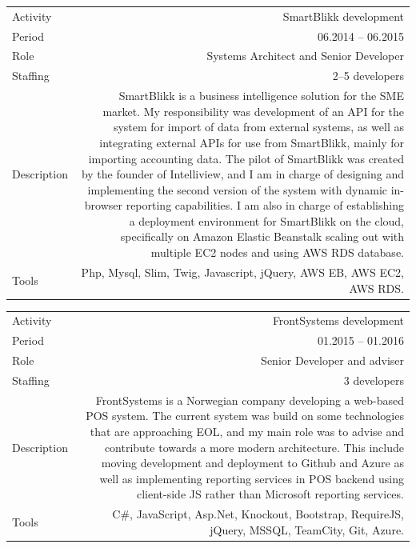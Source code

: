 \documentclass[english,a4paper,11pt]{article}
\begin{document}
\begin{longtable}{@{}LR}
Activity & SmartBlikk development \\ 
Period & 06.2014 -- 06.2015 \\ 
Role & Systems Architect and Senior Developer \\ 
Staffing & 2--5 developers \\ 
Description & SmartBlikk is a business intelligence solution for the SME market. My responsibility was development of an API for the system for import of data from external systems, as well as integrating external APIs for use from SmartBlikk, mainly for importing accounting data. The pilot of SmartBlikk was created by the founder of Intelliview, and I am in charge of designing and implementing the second version of the system with dynamic in-browser reporting capabilities. I am also in charge of establishing a deployment environment for SmartBlikk on the cloud, specifically on Amazon Elastic Beanstalk scaling out with multiple EC2 nodes and using AWS RDS database. \\ 
Tools & Php, Mysql, Slim, Twig, Javascript, jQuery, AWS EB, AWS EC2, AWS RDS. \\ 
\end{longtable}

\begin{longtable}{@{}LR}
Activity & FrontSystems development \\ 
Period & 01.2015 -- 01.2016 \\ 
Role & Senior Developer and adviser \\ 
Staffing & 3 developers \\ 
Description & FrontSystems is a Norwegian company developing a web-based POS system. The current system was build on some technologies that are approaching EOL, and my main role was to advise and contribute towards a more modern architecture. This include moving development and deployment to Github and Azure as well as implementing reporting services in POS backend using client-side JS rather than Microsoft reporting services. \\ 
Tools & C\#, JavaScript, Asp.Net, Knockout, Bootstrap, RequireJS, jQuery, MSSQL, TeamCity, Git, Azure. \\ 
\end{longtable}
\end{document}
